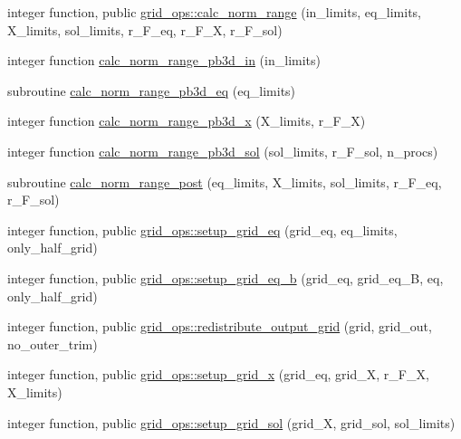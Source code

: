 \begin{DoxyCompactItemize}
\item 
integer function, public \hyperlink{namespacegrid__ops_a596695cab6971ec6b9d32d13a50708b6}{grid\+\_\+ops\+::calc\+\_\+norm\+\_\+range} (in\+\_\+limits, eq\+\_\+limits, X\+\_\+limits, sol\+\_\+limits, r\+\_\+\+F\+\_\+eq, r\+\_\+\+F\+\_\+X, r\+\_\+\+F\+\_\+sol)
\item 
integer function \hyperlink{grid__ops_8f90_aebe21d718069318bced62bc3d2d09393}{calc\+\_\+norm\+\_\+range\+\_\+pb3d\+\_\+in} (in\+\_\+limits)
\item 
subroutine \hyperlink{grid__ops_8f90_a868669b6df6c0fa6a8cedd993042f6ea}{calc\+\_\+norm\+\_\+range\+\_\+pb3d\+\_\+eq} (eq\+\_\+limits)
\item 
integer function \hyperlink{grid__ops_8f90_a242e1c26e16f9cd4b7604de7a90a7472}{calc\+\_\+norm\+\_\+range\+\_\+pb3d\+\_\+x} (X\+\_\+limits, r\+\_\+\+F\+\_\+X)
\item 
integer function \hyperlink{grid__ops_8f90_a9121423739548f1a1fa4e87055f49010}{calc\+\_\+norm\+\_\+range\+\_\+pb3d\+\_\+sol} (sol\+\_\+limits, r\+\_\+\+F\+\_\+sol, n\+\_\+procs)
\item 
subroutine \hyperlink{grid__ops_8f90_ad037c191ae770bd79529506953f0e307}{calc\+\_\+norm\+\_\+range\+\_\+post} (eq\+\_\+limits, X\+\_\+limits, sol\+\_\+limits, r\+\_\+\+F\+\_\+eq, r\+\_\+\+F\+\_\+sol)
\item 
integer function, public \hyperlink{namespacegrid__ops_ab749b0904ed8c69253fe8908c2624bcd}{grid\+\_\+ops\+::setup\+\_\+grid\+\_\+eq} (grid\+\_\+eq, eq\+\_\+limits, only\+\_\+half\+\_\+grid)
\item 
integer function, public \hyperlink{namespacegrid__ops_ad16495ddd320562451c2325bafecf2d8}{grid\+\_\+ops\+::setup\+\_\+grid\+\_\+eq\+\_\+b} (grid\+\_\+eq, grid\+\_\+eq\+\_\+B, eq, only\+\_\+half\+\_\+grid)
\item 
integer function, public \hyperlink{namespacegrid__ops_ab10ef5b486ee3861df2da4e53bc22630}{grid\+\_\+ops\+::redistribute\+\_\+output\+\_\+grid} (grid, grid\+\_\+out, no\+\_\+outer\+\_\+trim)
\item 
integer function, public \hyperlink{namespacegrid__ops_a1047889ec84da6e56aae619570a16988}{grid\+\_\+ops\+::setup\+\_\+grid\+\_\+x} (grid\+\_\+eq, grid\+\_\+X, r\+\_\+\+F\+\_\+X, X\+\_\+limits)
\item 
integer function, public \hyperlink{namespacegrid__ops_ae4f50f7b63e0a8b84dae6b98fd3e5d71}{grid\+\_\+ops\+::setup\+\_\+grid\+\_\+sol} (grid\+\_\+X, grid\+\_\+sol, sol\+\_\+limits)

\end{DoxyCompactItemize}
